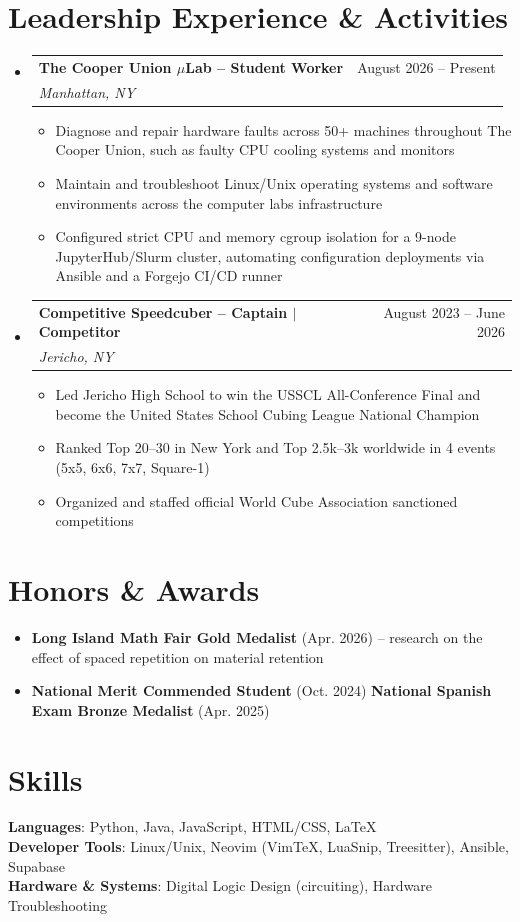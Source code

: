 \documentclass[letterpaper,11pt]{article}
\makeatletter
\newcommand{\resumeItem}[1]{
  \item\small{
    {#1 \vspace{-2pt}}
  }
}
\newcommand{\resumeSubheading}[4]{
  \vspace{-2pt}\item
    \begin{tabular*}{0.97\textwidth}[t]{l@{\extracolsep{\fill}}r}
      \textbf{#1} & #2 \\
      \textit{\small#3} & \textit{\small #4} \\
    \end{tabular*}\vspace{-7pt}
}
\newcommand{\resumeSubHeadingListStart}{\begin{itemize}[leftmargin=0.15in, label={}]}
\newcommand{\resumeSubHeadingListEnd}{\end{itemize}}
\newcommand{\resumeItemListStart}{\begin{itemize}}
\newcommand{\resumeItemListEnd}{\end{itemize}\vspace{-5pt}}
\makeatother
\begin{document}
\section{Leadership Experience \& Activities}
  \resumeSubHeadingListStart
    \resumeSubheading
      {The Cooper Union $\mu$Lab -- Student Worker}{August 2026 -- Present}
      {Manhattan, NY}{}
      \resumeItemListStart
        \resumeItem{Diagnose and repair hardware faults across 50+ machines throughout The Cooper Union, such as faulty CPU cooling systems and monitors}
        \resumeItem{Maintain and troubleshoot Linux/Unix operating systems and software environments across the computer labs infrastructure}
        \resumeItem{Configured strict CPU and memory cgroup isolation for a 9-node JupyterHub/Slurm cluster, automating configuration deployments via Ansible and a Forgejo CI/CD runner}
      \resumeItemListEnd
    \resumeSubheading
      {Competitive Speedcuber -- Captain $|$ Competitor}{August 2023 -- June 2026}
      {Jericho, NY}{}
      \resumeItemListStart
        \resumeItem{Led Jericho High School to win the USSCL All-Conference Final and become the United States School Cubing League National Champion}
        \resumeItem{Ranked Top 20--30 in New York and Top 2.5k--3k worldwide in 4 events (5x5, 6x6, 7x7, Square-1)}
        \resumeItem{Organized and staffed official World Cube Association sanctioned competitions}
      \resumeItemListEnd
  \resumeSubHeadingListEnd

\section{Honors \& Awards}
  \resumeSubHeadingListStart
    \resumeItemListStart
      \resumeItem{\textbf{Long Island Math Fair Gold Medalist} (Apr. 2026) -- research on the effect of spaced repetition on material retention}
      \resumeItem{\textbf{National Merit Commended Student} (Oct. 2024) \textbar{} \textbf{National Spanish Exam Bronze Medalist} (Apr. 2025)}
    \resumeItemListEnd
  \resumeSubHeadingListEnd

\section{Skills}
 \begin{itemize}[leftmargin=0.15in, label={}]
    \small{\item{
     \textbf{Languages}{: Python, Java, JavaScript, HTML/CSS, LaTeX} \\
     \textbf{Developer Tools}{: Linux/Unix, Neovim (VimTeX, LuaSnip, Treesitter), Ansible, Supabase} \\
     \textbf{Hardware \& Systems}{: Digital Logic Design (circuiting), Hardware Troubleshooting}
    }}
 \end{itemize}
\end{document}
